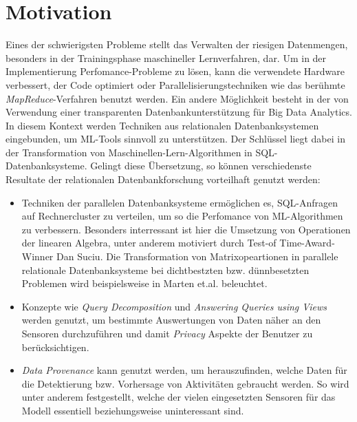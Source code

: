 \section*{Motivation}
Eines der schwierigsten Probleme stellt das Verwalten der riesigen Datenmengen, besonders in der Trainingsphase maschineller Lernverfahren, dar. Um in der Implementierung Perfomance-Probleme zu lösen, kann die verwendete Hardware verbessert, der Code optimiert oder Parallelisierungstechniken wie das berühmte \textit{MapReduce}-Verfahren\cite{DBLP:journals/cn/BrinP98} benutzt werden. Ein andere Möglichkeit besteht in der von Verwendung einer transparenten Datenbankunterstützung\cite{DBLP:conf/gvd/MartenH15} für Big Data Analytics. In diesem Kontext werden Techniken aus relationalen Datenbanksystemen eingebunden, um ML-Tools sinnvoll zu unterstützen.
Der Schlüssel liegt dabei in der Transformation von Maschinellen-Lern-Algorithmen in SQL-Datenbanksysteme. Gelingt diese Übersetzung, so können verschiedenste Resultate der relationalen Datenbankforschung vorteilhaft genutzt werden:
\begin{itemize}
    \item Techniken der parallelen Datenbanksysteme ermöglichen es, SQL-Anfragen auf Rechnercluster zu verteilen, um so die Perfomance von ML-Algorithmen zu verbessern. Besonders interressant ist hier die Umsetzung von Operationen der linearen Algebra, unter anderem motiviert durch Test-of Time-Award-Winner Dan Suciu\cite{interviewsuciu}. Die Transformation von Matrixopeartionen in parallele relationale Datenbanksysteme bei dichtbestzten bzw. dünnbesetzten Problemen wird beispielsweise in Marten et.al.\cite{martensparse} beleuchtet.
    \item Konzepte wie \textit{Query Decomposition}\cite{chirkova2011materialized} und \textit{Answering Queries using Views}\cite{ afrati2019answering, levy1999answering} werden genutzt, um bestimmte Auswertungen von Daten näher an den Sensoren durchzuführen und damit \textit{Privacy}\cite{agrawal2000privacy} Aspekte der Benutzer zu berücksichtigen.
    \item \textit{Data Provenance} \cite{heuer2015metis, bruder2017konzepte} kann genutzt werden, um herauszufinden, welche Daten für die Detektierung bzw. Vorhersage von Aktivitäten gebraucht werden. 
    So wird unter anderem festgestellt, welche der vielen eingesetzten Sensoren für das Modell essentiell beziehungsweise uninteressant sind.
\end{itemize}

